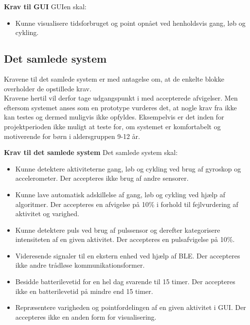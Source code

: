 \textbf{Krav til GUI} \newline 
GUIen skal:
\begin{itemize}
	\item Kunne visualisere tidsforbruget og point opnået ved henholdsvis gang, løb og cykling. 
\end{itemize}

\subsection{Det samlede system} \label{krav_samlet_sys}
Kravene til det samlede system er med antagelse om, at de enkelte blokke overholder de opstillede krav.\\
Kravene hertil vil derfor tage udgangspunkt i  med accepterede afvigelser. Men eftersom systemet anses som en prototype vurderes det, at nogle krav fra  ikke kan testes og dermed muligvis ikke opfyldes. %
Eksempelvis er det inden for projektperioden ikke muligt at teste for, om systemet er komfortabelt og motiverende for børn i aldersgruppen 9-12 år.

\textbf{Krav til det samlede system} \newline
Det samlede system skal:
\begin{itemize}
	\item Kunne detektere aktiviteterne gang, løb og cykling ved brug af gyroskop og accelerometer. Der accepteres ikke brug af andre sensorer.
	\item Kunne lave automatisk adskillelse af gang, løb og cykling ved hjælp af algoritmer. Der accepteres en afvigelse på 10\% i forhold til fejlvurdering af aktivitet og varighed.
	\item Kunne detektere puls ved brug af pulssensor og derefter kategorisere intensiteten af en given aktivitet. Der accepteres en pulsafvigelse på 10\%.
	\item Videresende signaler til en ekstern enhed ved hjælp af BLE. Der accepteres ikke andre trådløse kommunikationsformer.
	\item Besidde batterilevetid for en hel dag svarende til 15 timer. Der accepteres ikke en batterilevetid på mindre end 15 timer.
	\item Repræsentere varigheden og pointfordelingen af en given aktivitet i GUI. Der accepteres ikke en anden form for visualisering. 
\end{itemize}

